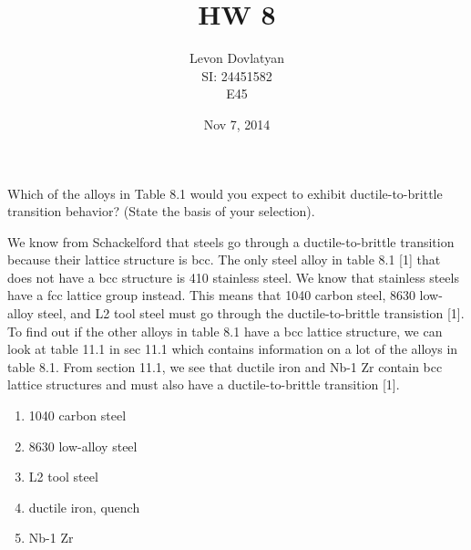\documentclass[12pt]{article}
\newenvironment{problem}[2][Problem]{\begin{trivlist}
\item[\hskip \labelsep {\bfseries #1}\hskip \labelsep {\bfseries #2.}]}{\end{trivlist}}
\begin{document}
\providecommand{\e}[1]{\ensuremath{\times 10^{#1}}}
\providecommand{\ex}[1]{\ensuremath{10^{#1}}}
 
\title{HW 8}
\author{Levon Dovlatyan \\ SI: 24451582\\ E45} 
\date{Nov 7, 2014}
\maketitle
 
\begin{problem}{8.1} 
Which of the alloys in Table 8.1 would you expect to exhibit ductile-to-brittle transition behavior?  (State the basis of your selection).
\end{problem}
We know from Schackelford that steels go through a ductile-to-brittle transition because their lattice structure is bcc. The only steel alloy in table 8.1 [1] that does not have a bcc structure is 410 stainless steel. We know that stainless steels have a fcc lattice group instead. This means that 1040 carbon steel, 8630 low-alloy steel, and L2 tool steel must go through the ductile-to-brittle transistion [1]. To find out if the other alloys in table 8.1 have a bcc lattice structure, we can look at table 11.1 in sec 11.1 which contains information on a lot of the alloys in table 8.1. From section 11.1, we see that ductile iron and Nb-1 Zr contain bcc lattice structures and must also have a ductile-to-brittle transition [1].
\begin{enumerate}
\item 1040 carbon steel
\item 8630 low-alloy steel
\item L2 tool steel
\item ductile iron, quench
\item Nb-1 Zr
\end{enumerate}
\end{document}
